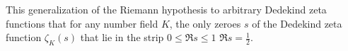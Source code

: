 \documentclass[12pt]{article}
\newcommand{\<}{\langle}
\renewcommand{\>}{\rangle}
\begin{document}
This generalization of the Riemann hypothesis to arbitrary Dedekind zeta functions  that for any number field $K$, the only zeroes $s$ of the Dedekind zeta function $\zeta_K(s)$ that lie in the strip $0\leq\Re s\leq 1$  $\Re s=\frac{1}{2}$.
\end{document}
